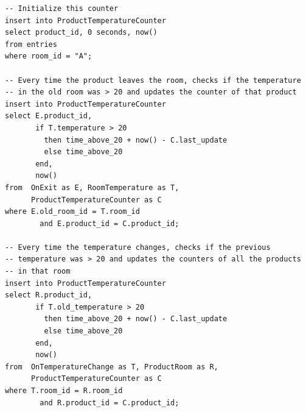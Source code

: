 \documentclass{report}
\begin{document}
\begin{lstlisting}
-- Initialize this counter
insert into ProductTemperatureCounter
select product_id, 0 seconds, now()
from entries
where room_id = "A";

-- Every time the product leaves the room, checks if the temperature
-- in the old room was > 20 and updates the counter of that product
insert into ProductTemperatureCounter
select E.product_id,
       if T.temperature > 20
         then time_above_20 + now() - C.last_update
         else time_above_20
       end,
       now()
from  OnExit as E, RoomTemperature as T,
      ProductTemperatureCounter as C
where E.old_room_id = T.room_id
        and E.product_id = C.product_id;

-- Every time the temperature changes, checks if the previous
-- temperature was > 20 and updates the counters of all the products
-- in that room
insert into ProductTemperatureCounter
select R.product_id,
       if T.old_temperature > 20
         then time_above_20 + now() - C.last_update
         else time_above_20
       end,
       now()
from  OnTemperatureChange as T, ProductRoom as R,
      ProductTemperatureCounter as C
where T.room_id = R.room_id
        and R.product_id = C.product_id;
\end{lstlisting}
\end{document}
